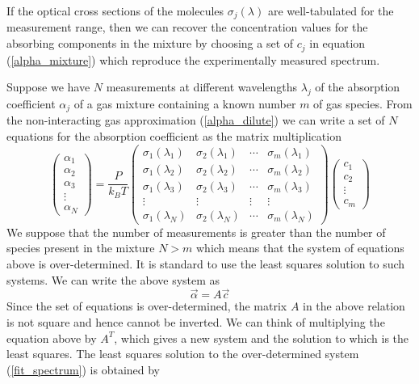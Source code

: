 \documentclass[12pt]{report}
\begin{document}
	If the optical cross sections of the molecules $\sigma_j(\lambda)$ are well-tabulated for the measurement range, then we can recover the concentration values for the absorbing components in the mixture by choosing a set of $c_j$ in equation (\ref{alpha_mixture}) which reproduce the experimentally measured spectrum.
	
	Suppose we have $N$ measurements at different wavelengths $\lambda_j$ of the absorption coefficient $\alpha_j$ of a gas mixture containing a known number $m$ of gas species. From the non-interacting gas approximation (\ref{alpha_dilute}) we can write a set of $N$ equations for the absorption coefficient as the matrix multiplication
	\begin{equation} \label{fit_spectrum}
		\begin{pmatrix}
			\alpha_1 \\
			\alpha_2 \\
			\alpha_3 \\
			\vdots \\
			\alpha_N
		\end{pmatrix} =
		\frac{P}{k_B T}
		\begin{pmatrix}
			\sigma_1(\lambda_1) &  \sigma_2(\lambda_1) & \cdots & \sigma_m(\lambda_1) \\
			\sigma_1(\lambda_2) &  \sigma_2(\lambda_2) & \cdots & \sigma_m(\lambda_2) \\
			\sigma_1(\lambda_3) &  \sigma_2(\lambda_3) & \cdots & \sigma_m(\lambda_3) \\
			\vdots & \vdots& \vdots & \vdots \\
			\sigma_1(\lambda_N) & \sigma_2(\lambda_N) & \cdots &  \sigma_m(\lambda_N)
		\end{pmatrix}
		\begin{pmatrix}
			c_1 \\
			c_2 \\
			\vdots \\
			c_m
		\end{pmatrix}
	\end{equation}
	We suppose that the number of measurements is greater than the number of species present in the mixture $N > m$ which means that the system of equations above is over-determined. It is standard to use the least squares solution to such systems. We can write the above system as
	\begin{equation}
		\vec{\alpha} = A \vec{c}
	\end{equation}
	Since the set of equations is over-determined, the matrix $A$ in the above relation is not square and hence cannot be inverted. We can think of multiplying the equation above by $A^T$, which gives a new system and the solution to which is the least squares. The least squares solution to the over-determined system (\ref{fit_spectrum}) is obtained by
\end{document}
